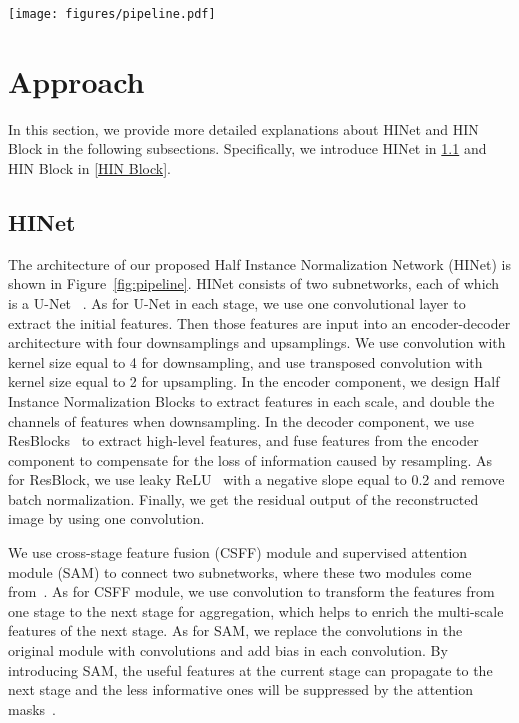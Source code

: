 \documentclass[final]{cvpr}
\begin{document}
\begin{figure*}
    \centering
    \texttt{[image: figures/pipeline.pdf]}
    \caption{Proposed Half Instance Normalization Network (HINet). The encoder of each subnetwork contains Half Instance Normalization Blocks (HIN Block). For simplicity, we only show 3 layers of HIN Block in the figure, and HINet has a total of 5 layers. We adopt CSFF and SAM modules from MPRNet~\cite{Zamir2021MPRNet}.}
    \label{fig:pipeline}
    \vspace{-0.2cm}
\end{figure*}

\section{Approach}
In this section, we provide more detailed explanations about HINet and HIN Block in the following subsections. Specifically, we introduce HINet in \ref{HINet} and HIN Block in \ref{HIN Block}.

\subsection{HINet}
\label{HINet}
The architecture of our proposed Half Instance Normalization Network (HINet) is shown in Figure~\ref{fig:pipeline}. HINet consists of two subnetworks, each of which is a U-Net ~\cite{ronneberger2015u}. 
As for U-Net in each stage, we use one  convolutional layer to extract the initial features. Then those features are input into an encoder-decoder architecture with four downsamplings and upsamplings. We use convolution with kernel size equal to 4 for downsampling, and use transposed convolution with kernel size equal to 2 for upsampling. In the encoder component, we design Half Instance Normalization Blocks to extract features in each scale, and double the channels of features when downsampling. In the decoder component, we use ResBlocks~\cite{he2016deep}  to extract high-level features, and fuse features from the encoder component to compensate for the loss of information caused by resampling. As for ResBlock, we use leaky ReLU~\cite{maas2013rectifier} with a negative slope equal to 0.2 and remove batch normalization. Finally, we get the residual output of the reconstructed image by using one  convolution.

We use cross-stage feature fusion (CSFF) module and supervised attention module (SAM) to connect two subnetworks, where these two modules come from~\cite{zamir2021multi}. As for CSFF module, we use  convolution to transform the features from one stage to the next stage for aggregation, which helps to enrich the multi-scale features of the next stage. As for SAM, we replace the  convolutions in the original module with  convolutions and add bias in each convolution. By introducing SAM, the useful features at the current stage can propagate to the next stage and the less informative ones will be suppressed by the attention masks~\cite{zamir2021multi}.
\end{document}
